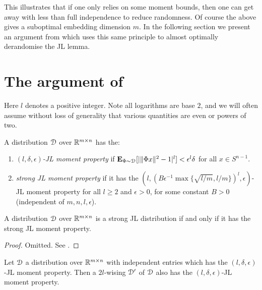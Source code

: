 This illustrates that if one only relies on some moment bounds, then
one can get away with less than full independence to reduce
randomness. Of course the above gives a suboptimal embedding dimension
$m$. In the following section we present an argument from
\cite{kane-2011} which uses this same principle to almost optimally
derandomise the JL lemma.


\section{The argument of \cite{kane-2011}}

\begin{notation}
  Here $l$ denotes a positive integer. Note all logarithms are base
  $2$, and we will often assume without loss of generality that
  various quantities are even or powers of two.
\end{notation}

\begin{definitions}
  \label{JL-moment}
  A distribution $\mathcal{D}$ over $\mathbb{R}^{m \times n}$ has the:
  \begin{enumerate}
  \item \emph{$(l,\delta,\epsilon)$-JL moment property} if $\operatorname*{\mathbf{E}}_{\Phi
    \sim \mathcal{D}} [|\|\Phi x\|^2 - 1|^l] < \epsilon^l\delta$ for all $x \in
    S^{n-1}$.
  \item \emph{strong JL moment property} if it has the $(l,
    (B\epsilon^{-1}\max \{\sqrt{l/m}, l/m\})^l, \epsilon)$-JL moment
    property for all $l \ge 2$ and $\epsilon > 0$, for some constant
    $B > 0$ (independent of $m,n,l,\epsilon$).
  \end{enumerate}
\end{definitions}

\begin{lemma}
  \label{distribution-iff-moment}
  A distribution $\mathcal{D}$ over $\mathbb{R}^{m \times n}$ is a strong JL
  distribution if and only if it has the strong JL moment property.
\end{lemma}

\begin{proof}
  Omitted. See \cite{kane-2011}.
\end{proof}

\begin{lemma}
  \label{moment-wise}
  Let $\mathcal{D}$ a distribution over $\mathbb{R}^{m \times n}$ with independent
  entries which has the $(l,\delta,\epsilon)$-JL moment
  property. Then a $2l$-wising $\mathcal{D}'$ of $\mathcal{D}$ also has the
  $(l,\delta,\epsilon)$-JL moment property.
\end{lemma}

